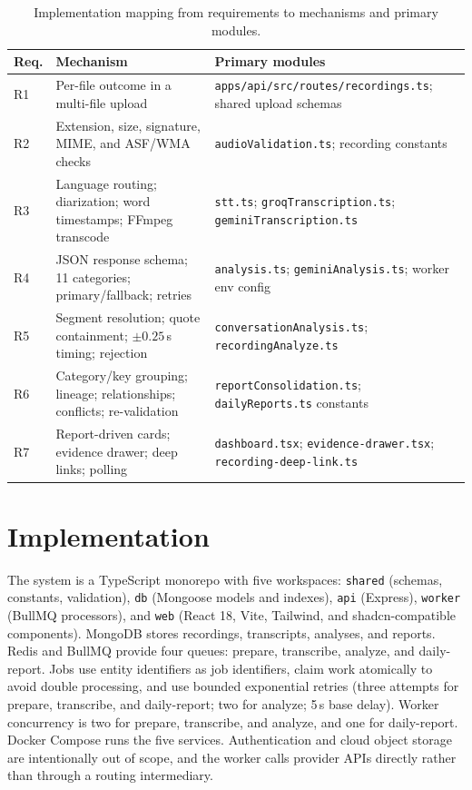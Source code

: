 \documentclass[conference,a4paper]{IEEEtran}
\newcommand{\code}[1]{\texttt{#1}}
\begin{document}
\begin{table}[t]
\centering
\caption{Implementation mapping from requirements to mechanisms and primary modules.}
\label{tab:impl}
\footnotesize
\renewcommand{\arraystretch}{1.15}
\begin{tabular}{@{}>{\raggedright\arraybackslash}p{0.7cm}>{\raggedright\arraybackslash}p{5.4cm}>{\raggedright\arraybackslash}p{8.6cm}@{}}
\toprule
Req. & Mechanism & Primary modules \\
\midrule
R1 & Per-file outcome in a multi-file upload & \code{apps/api/src/routes/recordings.ts}; shared upload schemas \\
R2 & Extension, size, signature, MIME, and ASF/WMA checks & \code{audioValidation.ts}; recording constants \\
R3 & Language routing; diarization; word timestamps; FFmpeg transcode & \code{stt.ts}; \code{groqTranscription.ts}; \code{geminiTranscription.ts} \\
R4 & JSON response schema; 11 categories; primary/fallback; retries & \code{analysis.ts}; \code{geminiAnalysis.ts}; worker env config \\
R5 & Segment resolution; quote containment; $\pm0.25$\,s timing; rejection & \code{conversationAnalysis.ts}; \code{recordingAnalyze.ts} \\
R6 & Category/key grouping; lineage; relationships; conflicts; re-validation & \code{reportConsolidation.ts}; \code{dailyReports.ts} constants \\
R7 & Report-driven cards; evidence drawer; deep links; polling & \code{dashboard.tsx}; \code{evidence-drawer.tsx}; \code{recording-deep-link.ts} \\
\bottomrule
\end{tabular}
\end{table}

\section{Implementation}

The system is a TypeScript monorepo with five workspaces: \code{shared} (schemas,
constants, validation), \code{db} (Mongoose models and indexes), \code{api} (Express),
\code{worker} (BullMQ processors), and \code{web} (React 18, Vite, Tailwind, and
shadcn-compatible components). MongoDB stores recordings, transcripts, analyses, and
reports. Redis and BullMQ provide four queues: prepare, transcribe, analyze, and
daily-report. Jobs use entity identifiers as job identifiers, claim work atomically to
avoid double processing, and use bounded exponential retries (three attempts for prepare,
transcribe, and daily-report; two for analyze; 5\,s base delay). Worker concurrency is two
for prepare, transcribe, and analyze, and one for daily-report. Docker Compose runs the
five services. Authentication and cloud object storage are intentionally out of scope, and
the worker calls provider APIs directly rather than through a routing intermediary.
\end{document}
